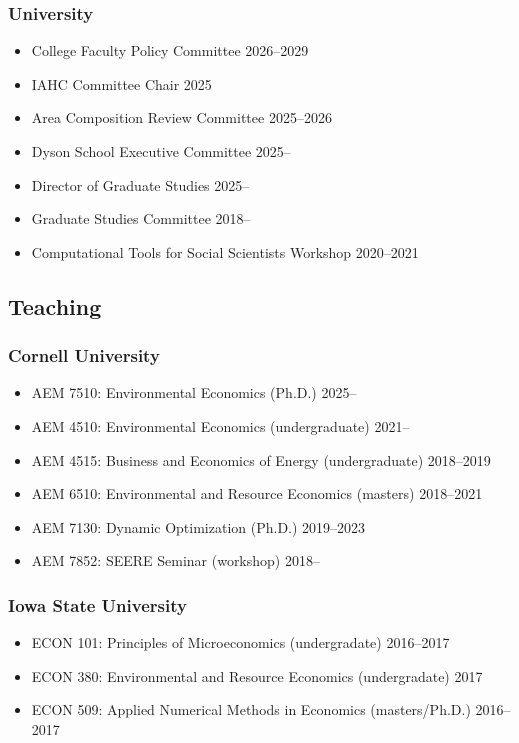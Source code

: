 \documentclass[11pt]{res} %
\begin{document}
\begin{resume}
\vspace{-.2in}

\subsubsection{University}
\begin{itemize} \itemsep -1pt
	\item[] College Faculty Policy Committee \hfill 2026--2029
	\item[] IAHC Committee Chair \hfill 2025
	\item[] Area Composition Review Committee \hfill 2025--2026
	\item[] Dyson School Executive Committee \hfill 2025--
	\item[] Director of Graduate Studies \hfill 2025--
	\item[]	Graduate Studies Committee \hfill 2018--
	\item[] Computational Tools for Social Scientists Workshop \hfill 2020--2021
\end{itemize}

\vspace{-.2in}

\subsection{Teaching}\vspace{-.2in}
\subsubsection{Cornell University}
\begin{itemize} \itemsep -1pt
	\item[] AEM 7510: Environmental Economics (Ph.D.) \hfill 2025--
	\item[] AEM 4510: Environmental Economics (undergraduate) \hfill 2021--
	\item[] AEM 4515: Business and Economics of Energy (undergraduate) \hfill 2018--2019
	\item[] AEM 6510: Environmental and Resource Economics (masters) \hfill 2018--2021
	\item[] AEM 7130: Dynamic Optimization (Ph.D.) \hfill 2019--2023
	\item[] AEM 7852: SEERE Seminar (workshop) \hfill 2018--
\end{itemize}\vspace{-.3in}
\subsubsection{Iowa State University}
\begin{itemize} \itemsep -1pt
	\item[] ECON 101: Principles of Microeconomics (undergradate) \hfill 2016--2017
	\item[] ECON 380: Environmental and Resource Economics (undergradate) \hfill 2017
	\item[] ECON 509: Applied Numerical Methods in Economics (masters/Ph.D.) \hfill 2016--2017
\end{itemize}\vspace{-.3in}

\end{resume}
\end{document}
